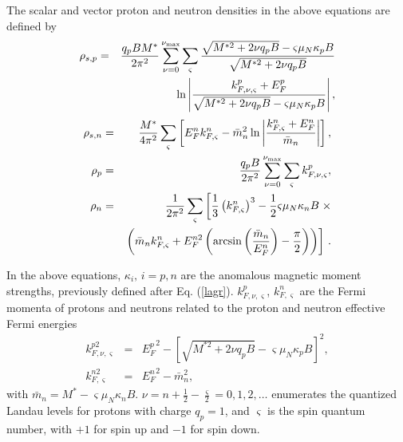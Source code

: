 \documentclass[epj]{svjour}
\begin{document}
The scalar and vector proton and neutron  densities  in the above equations are defined by \cite{Broderick2000,PerezGarcia2011}
\begin{eqnarray}
\rho_{s,p}&=&\frac{q_{p}B M^*}{2\pi^{2}}\sum_{\nu=0}^{\nu_{\rm max}}\sum_{\varsigma}\frac{\sqrt{M^{* 2}+2\nu 
q_{p}B}-{\varsigma}\mu_{N}\kappa_{p}B}{\sqrt{M^{* 2}+2\nu q_{p}B}} \nonumber\\ &&\ln\left|\frac{k^{p}_{F,\nu, {\varsigma}}+E^{p}_{F}}
                                                                            {\sqrt{M^{*
                                                                        2}+2\nu
                                                                        q_{p}B}-{\varsigma}\mu_{N}\kappa_{p}B}
                                                                        \right|,
                                                                        \label{rhosp} 
\end{eqnarray}
\begin{eqnarray}
\rho_{s,n}&=&\frac{M^{*}}{4\pi^{2}}\sum_{{\varsigma}} \left[E^ {n}_{F}k^{n}_{F, {\varsigma}}-\bar{m}^{2}_{n}\ln\left|
\frac{k^{n}_{F, {\varsigma}}+E^{n}_{F}}{\bar{m}_{n}} \right|\right], \label{rhosn} \\
\rho_{p}&=&\frac{q_{p}B}{2\pi^{2}}\sum_{\nu=0}^{\nu_{\rm
      max}}\sum_{{\varsigma}}k^{p}_{F,\nu,\varsigma}, \label{rhop}  \\ 
\rho_{n}&=&\frac{1}{2\pi^{2}}\sum_{{\varsigma}}\left[ \frac{1}{3}\left(k^{n}_{F, {\varsigma}}\right) ^{3}-\frac{1}
            {2}{\varsigma}\mu_{N}\kappa_{n}B \right.\times \nonumber\\
  && \left.\left(\bar{m}_{n}k^{n}_{F, {\varsigma}}+E^{n 2}_{F}\left(\arcsin\left( \frac{\bar{m}_{n}}
{E^{n}_{F}}\right) -\frac{\pi}{2} \right)  \right) \right]\, .
\label{rhon}
\end{eqnarray}

 In the above equations, $\kappa_i,\, i=p,n$ are the anomalous
magnetic moment strengths, previously defined after Eq. (\ref{lagr}).
$k^{p}_{F, \nu, {\varsigma}}$, $ k^{n}_{F, {\varsigma}}$ are the Fermi momenta of protons and neutrons
related to the proton and neutron effective Fermi energies
\begin{eqnarray}
k^{p 2}_{F,\nu, {\varsigma}}&=&{E^p_{F}}^{2}-\left[\sqrt{M^{* 2}+2\nu q_{p}B}-{\varsigma}\mu_{N}\kappa_{p}B\right] ^{2}, \label{kfp}\\
k^{n 2}_{F, {\varsigma}}&=&{E^n_{F}}^{2}-\bar{m}^{2}_{n}, \label{kfn}
\end{eqnarray}
 with $\bar{m}_{n}=M^{*}-{\varsigma}\mu_{N}\kappa_{n}B$.
 $\nu=n+\frac{1}{2}-\frac{{\varsigma}}{2}=0, 1, 2, \ldots$ enumerates the quantized  Landau levels for  protons with charge $q_p=1$, and ${\varsigma}$ is the spin quantum number, with $+1$ for spin up and $-1$ for spin down. 
 
\end{document}
